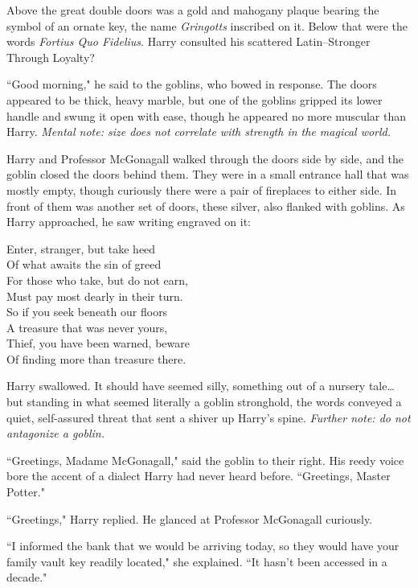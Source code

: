 Above the great double doors was a gold and mahogany plaque bearing the symbol of an ornate key, the name \emph{Gringotts} inscribed on it. Below that were the words \emph{Fortius Quo Fidelius}. Harry consulted his scattered Latin\---Stronger Through Loyalty?

``Good morning," he said to the goblins, who bowed in response. The doors appeared to be thick, heavy marble, but one of the goblins gripped its lower handle and swung it open with ease, though he appeared no more muscular than Harry. \emph{Mental note: size does not correlate with strength in the magical world.}

Harry and Professor McGonagall walked through the doors side by side, and the goblin closed the doors behind them. They were in a small entrance hall that was mostly empty, though curiously there were a pair of fireplaces to either side. In front of them was another set of doors, these silver, also flanked with goblins. As Harry approached, he saw writing engraved on it:

\begin{inscription}
\begin{samepage}
Enter, stranger, but take heed\\
Of what awaits the sin of greed\\
For those who take, but do not earn,\\
Must pay most dearly in their turn.\\
So if you seek beneath our floors\\
A treasure that was never yours,\\
Thief, you have been warned, beware\\
Of finding more than treasure there.
\end{samepage}
\end{inscription}

Harry swallowed. It should have seemed silly, something out of a nursery tale{\ldots} but standing in what seemed literally a goblin stronghold, the words conveyed a quiet, self-assured threat that sent a shiver up Harry's spine. \emph{Further note: do not antagonize a goblin.}

``Greetings, Madame McGonagall," said the goblin to their right. His reedy voice bore the accent of a dialect Harry had never heard before. ``Greetings, Master Potter."

``Greetings," Harry replied. He glanced at Professor McGonagall curiously.

``I informed the bank that we would be arriving today, so they would have your family vault key readily located," she explained. ``It hasn't been accessed in a decade."

